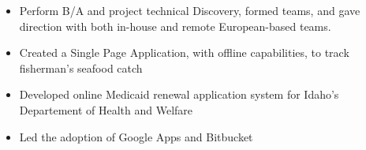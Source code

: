 \documentclass[10pt,a4paper]{article}
\begin{document}
{{{\begin{itemize}
      \item Perform B/A and project technical Discovery, formed teams, and gave direction with both in-house and remote European-based teams.
      \item Created a Single Page Application, with offline capabilities, to track fisherman's seafood catch
      \item Developed online Medicaid renewal application system for Idaho's Departement of Health and Welfare
      \item Led the adoption of Google Apps and Bitbucket 
    \end{itemize}
    }
    \vspace{0.5em}
    {}
  }  
   
}
\end{document}

